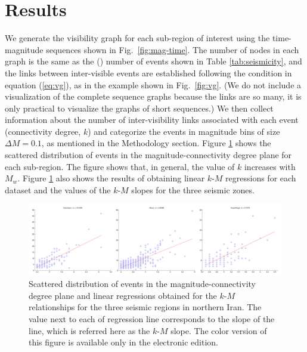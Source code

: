 
\section{Results}

We generate the  visibility graph for each sub-region of interest using the time-magnitude sequences shown in Fig.~\ref{fig:mag-time}. The number of nodes in each graph is the same as the () number of events shown in Table \ref{tab:seismicity}, and the links between inter-visible events are established following the condition in equation (\ref{eq:vg}), as in the example shown in Fig.~\ref{fig:vg}. (We do not include a visualization of the complete sequence graphs because the links are so many, it is only practical to visualize the graphs of short sequences.) We then collect information about the number of inter-visibility links associated with each event (connectivity degree, $k$) and categorize the events in magnitude bins of size $\Delta M = 0.1$, as mentioned in the Methodology section. Figure \ref{fig:km} shows the scattered distribution of events in the magnitude-connectivity degree plane for each sub-region. The figure shows that, in general, the value of $k$ increases with $M_w$. Figure \ref{fig:km} also shows the results of obtaining linear $k$-$M$ regressions for each dataset and the values of the $k$-$M$ slopes for the three seismic zones.

\begin{figure}[t]
	\centering
	\includegraphics[width=\textwidth]{figures/pdf/figure-06-rev.pdf} 
	\caption{Scattered distribution of events in the magnitude-connectivity degree plane and linear regressions obtained for the $k$-$M$ relationships for the three seismic regions in northern Iran. The value next to each of regression line corresponds to the slope of the line, which is referred here as the $k$-$M$ slope. The color version of this figure is available only in the electronic edition.}
	\label{fig:km}
\end{figure}

